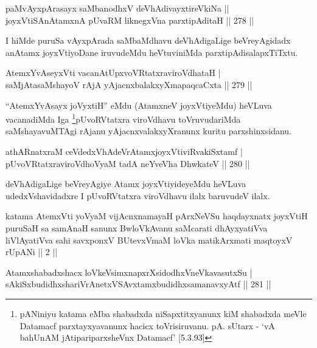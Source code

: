 
\begin{shl}
paMvAyxpArasayx saMbanodhxV deVhAdivayxtireVkiNa ||  \\
joyxVtiSA\s nAtamxnA pUvaRM liknegxVna parxtipAditaH \hfill ||  278 || 
\end{shl}

\begin{artha}
I hiMde puruSa vAyxpArada saMbaMdhavu deVhAdigaLige beVreyAgidadx anAtamx joyxVtiyoDane iruvudeMdu  heVtuviniMda parxtipAdisalapxTiTxtu.
\end{artha}

\begin{shl}
AtemxYvAseyxVti vacanAtUpxvoVRtatxraviroVdhataH | \\
saMjAtasaMshayoV rAjA yAjacnxbalakxyXmapaqcaCxta \hfill ||  279 ||  
\end{shl}

\begin{artha}
``AtemxYvAsayx joVyxtiH'' eMdu (AtamxneV joyxVtiyeMdu) heVLuva vacanadiMda Iga \footnote{pANiniyu katama eMba shabadxda niSapxtitxyanunx kiM shabadxda meVle Datamacf parxtayxyavanunx hacicx toVrisiruvanu. pA. sUtarx - `vA bahUnAM jAtipariparxsheVnx Datamacf' [5.3.93]}pUvoRVtatxra viroVdhavu toVruvudariMda saMshayavuMTAgi rAjanu yAjacnxvalakxyXranunx kuritu parxshinxsidanu.
\end{artha}

\begin{shl}
athARnatxraM ceVdedxVhAdeVrAtamxjoyxVtiviRvakiSxtamf | \\
pUvoVRtatxraviroVdhoV\s yaM tadA neYveVha DhwkateV \hfill ||  280 ||  
\end{shl}

\begin{artha}
deVhAdigaLige beVreyAgiye Atamx joyxVtiyideyeMdu heVLuva udedxVshavidadxre I pUvoRVtatxra viroVdhavu ilalx baruvudeV ilalx.
\end{artha}

\begin{shl}
katama AtemxVti yoV\s yaM vijAcnxnamayaH pArxNeVSu haqdayxnatx joyxVtiH puruSaH sa samAnaH sanunx BwloVkAvanu saMcarati dhAyxyatiVva liVlAyatiVva sahi savxponxV BUtevxVmaM loVka matikArxmati maqtoyxV rUpANi || 2 || 
\end{shl}


\begin{shl}
Atamxshabadxshacx loVkeV\s simxnapxrXsidodhxV\s neVkavasutxSu | \\
sAkiSxbudidhxshariVrAnetxVSAvxtamxbudidhxsamanavxyAtf \hfill ||  281 ||  
\end{shl}

